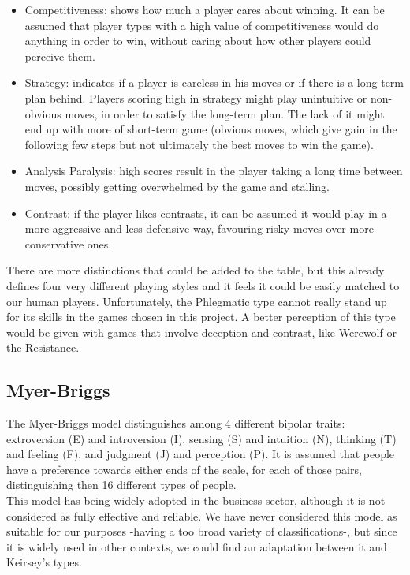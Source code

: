 \begin{itemize}
    \item Competitiveness: shows how much a player cares about winning. It can be assumed that player types with a high value of competitiveness would do anything in order to win, without caring about how other players could perceive them. 
    \item Strategy: indicates if a player is careless in his moves or if there is a long-term plan behind. Players scoring high in strategy might play unintuitive or non-obvious moves, in order to satisfy the long-term plan. The lack of it might end up with more of short-term game (obvious moves, which give gain in the following few steps but not ultimately the best moves to win the game).
    \item Analysis Paralysis: high scores result in the player taking a long time between moves, possibly getting overwhelmed by the game and stalling.
    \item Contrast: if the player likes contrasts, it can be assumed it would play in a more aggressive and less defensive way, favouring risky moves over more conservative ones.
\end{itemize}
There are more distinctions that could be added to the table, but this already defines four very different playing styles and it feels it could be easily matched to our human players.
Unfortunately, the Phlegmatic type cannot really stand up for its skills in the games chosen in this project. A better perception of this type would be given with games that involve deception and contrast, like Werewolf\cite{werewolf} or the Resistance\cite{resistance}.
\subsection{Myer-Briggs}
The Myer-Briggs model distinguishes among 4 different bipolar traits: extroversion (E) and introversion (I), sensing (S) and intuition (N), thinking (T) and feeling (F), and judgment (J) and perception (P). It is assumed that people have a preference towards either ends of the scale, for each of those pairs, distinguishing then 16 different types of people\cite{myers2010gifts,myerbriggs}.\\ 
This model has being widely adopted in the business sector, although it is not considered as fully effective and reliable\cite{pittenger1993measuring,boyle1995myers}.
We have never considered this model as suitable for our purposes -having a too broad variety of classifications-, but since it is widely used in other contexts, we could find an adaptation between it and Keirsey's types\cite[p.~23]{keirsey1998please}.
